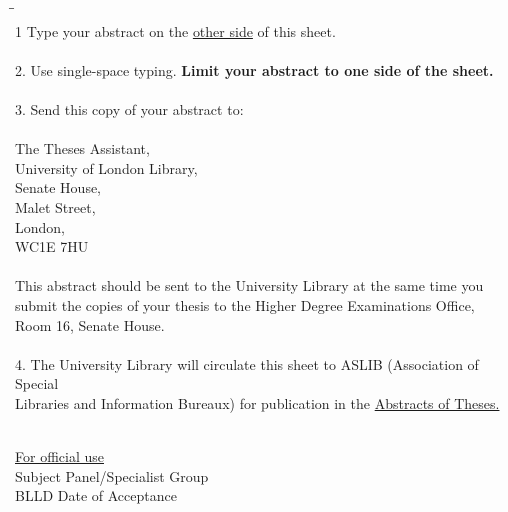 \documentclass[12pt]{article}
\begin{document}
\begin{tabbing}
\hspace*{1.5cm}\=\hspace*{1.5cm}\= \kill \\
1 \> Type your abstract on the \underline{other side} of this
sheet. \\
\\
2. \> Use single-space typing. {\bf Limit your abstract to one side of the
sheet.} \\
\\
3. \> Send this copy of your abstract to: \\
\\
 \> \> The Theses Assistant, \\
 \> \> University of London Library, \\
 \> \> Senate House, \\
 \> \> Malet Street, \\
 \> \> London, \\
 \> \> WC1E 7HU \\
\\
\> This abstract should be sent to the University Library at the same
time you \\
\>  submit the copies of your thesis to the Higher Degree Examinations
Office,\\ 
\>  Room 16, Senate House.\\
\\

4. \> The University Library will circulate this sheet to ASLIB
(Association of Special \\ 
\> Libraries and Information Bureaux) for publication in the
\underline{Abstracts of Theses.} 

\end{tabbing}

\hrulefill \\

\underline{For official use}\\

Subject Panel/Specialist Group \dotfill \\

BLLD \dotfill \dotfill Date of Acceptance \dotfill \\

\hrulefill \\
\end{document}
